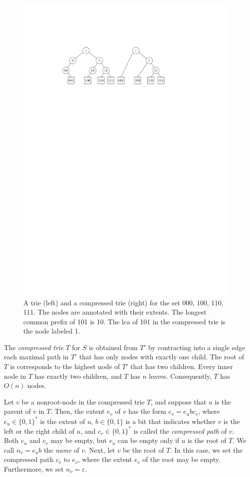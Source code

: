 \documentclass[a4paper,11pt]{article}
\newcommand{\eps}{\varepsilon}
\newcommand{\?}{\mskip1.5mu}
\begin{document}
\begin{figure}
  \centering
  \includegraphics{trie}
  \caption{A trie (left) and a compressed trie (right) for the set 
  000, 100, 110, 111. The nodes are annotated with their
  extents. The longest common prefix of 101 is  10. The 
  lca of 101 in the compressed trie
    is the node labeled 1.}
  \label{fig:trie}
\end{figure}

The \emph{compressed trie} $T$ for $S$ is obtained
from $T'$ by contracting into a single edge each maximal path in $T'$ that
has only nodes with exactly one child.
The root of $T$ is corresponds to the highest node of $T'$ that has 
two children.  Every inner node in $T$ has exactly two children,
and $T$ has $n$ leaves. 
Consequently, $T$ has $O(n)$ nodes. 

Let $v$ be a nonroot-node in the compressed trie $T$,
and suppose that $u$ is the parent of $v$ in $T$. Then, 
the extent $e_v$ of $v$ has the form $e_v = e_ubc_v$, 
where $e_u \in \{0, 1\}^*$ is the extent of $u$, $b \in \{0,1\}$ is 
a bit that indicates whether $v$ is the left or the right child
of $u$, and $c_v \in \{0, 1\}^*$ is called the \emph{compressed
path} of $v$. Both $e_u$ and $c_v$ may be empty, but $e_u$
can be empty only if $u$ is the root of $T$. 
We call $n_v = e_ub$ the \emph{name} of $v$.
Next, let $v$ be the root of $T$.
In this case, we set the compressed path $c_v$
to $e_v$, where the extent $e_v$ of the root may
be empty.
Furthermore, we set $n_v = \eps$.
\end{document}
